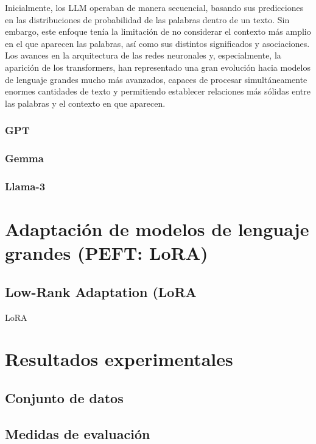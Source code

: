 \documentclass[11pt,spanish,listoffigures,listoftables]{tfgetsinf}
\begin{document}
Inicialmente, los LLM operaban de manera secuencial, basando sus predicciones en las distribuciones de probabilidad de las palabras dentro de un texto. Sin embargo, este enfoque tenía la limitación de no considerar el contexto más amplio en el que aparecen las palabras, así como sus distintos significados y asociaciones. Los  avances en la arquitectura de las redes neuronales y, especialmente, la aparición de los transformers, han representado una gran evolución hacia modelos de lenguaje grandes mucho más avanzados, capaces de procesar simultáneamente enormes cantidades de texto y permitiendo establecer relaciones más sólidas entre las palabras y el contexto en que aparecen.

\subsection{GPT}

\subsection{Gemma}

\subsection{Llama-3}


\chapter{Adaptación de modelos de lenguaje grandes (PEFT: LoRA)}

\section{Low-Rank Adaptation (LoRA}

LoRA \cite{hu2021loralowrankadaptationlarge}

\chapter{Resultados experimentales}

\section{Conjunto de datos}

\section{Medidas de evaluación}
\end{document}
